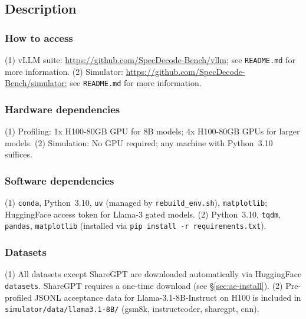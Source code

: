 \subsection{Description}
\label{sec:ae-desc}

\subsubsection{How to access}

(1) vLLM suite: \href{https://github.com/SpecDecode-Bench/vllm}{https://github.com/SpecDecode-Bench/vllm}; see \texttt{README.md} for more information.
(2) Simulator: \href{https://github.com/SpecDecode-Bench/simulator}{https://github.com/SpecDecode-Bench/simulator}; see \texttt{README.md} for more information.

\subsubsection{Hardware dependencies}

(1) Profiling: 1x H100-80GB GPU for 8B models; 4x H100-80GB GPUs for larger models.
(2) Simulation: No GPU required; any machine with Python~3.10 suffices. 

\subsubsection{Software dependencies}

(1) \texttt{conda}, Python~3.10, \texttt{uv} (managed by
\texttt{rebuild\_env.sh}), \texttt{matplotlib}; HuggingFace access token for Llama-3 gated models.
(2) Python~3.10, \texttt{tqdm}, \texttt{pandas}, \texttt{matplotlib}
(installed via \texttt{pip install -r requirements.txt}).

\subsubsection{Datasets}

(1) All datasets except ShareGPT are downloaded automatically via
HuggingFace \texttt{datasets}. ShareGPT requires a one-time download
(see \S\ref{sec:ae-install}).
(2) Pre-profiled JSONL acceptance data for Llama-3.1-8B-Instruct on
H100 is included in \texttt{simulator/data/llama3.1-8B/} (gsm8k,
instructcoder, sharegpt, cnn).


